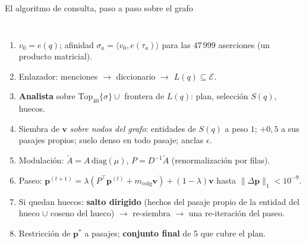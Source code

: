 \documentclass[aspectratio=169,10pt]{beamer}
\begin{document}
\begin{frame}{El algoritmo de consulta, paso a paso sobre el grafo}
\begin{columns}[T]
\footnotesize
\begin{enumerate}\footnotesize
\item $v_0=e(q)$; afinidad $\sigma_a=\langle v_0,e(\tau_a)\rangle$ para las
  $47\,999$ aserciones (un producto matricial).
\item Enlazador: menciones $\to$ diccionario $\to$ $L(q)\subseteq\mathcal E$.
\item \textbf{Analista} sobre $\mathrm{Top}_{40}\{\sigma\}\cup$ frontera de
  $L(q)$: plan, selección $S(q)$, huecos.
\item Siembra de $\mathbf v$ \emph{sobre nodos del grafo}: entidades de
  $S(q)$ a peso $1$; $+0{,}5$ a sus pasajes propios; suelo denso en todo
  pasaje; anclas $\epsilon$.
\item Modulación: $\tilde A=A\,\mathrm{diag}(\mu)$,
  $P=D^{-1}\tilde A$ (renormalización por filas).
\item Paseo: $\mathbf p^{(t+1)}=\lambda(P^{\top}\mathbf p^{(t)}+m_{\text{colg}}\mathbf v)+(1-\lambda)\mathbf v$
  hasta $\lVert\Delta\mathbf p\rVert_1<10^{-9}$.
\item Si quedan huecos: \textbf{salto dirigido} (hechos del pasaje propio de
  la entidad del hueco $\cup$ coseno del hueco) $\to$ re-siembra $\to$ una
  re-iteración del paseo.
\item Restricción de $\mathbf p^*$ a pasajes; \textbf{conjunto final} de 5
  que cubre el plan.
\end{enumerate}
\centering
{}
\end{columns}
\end{frame}
\end{document}
